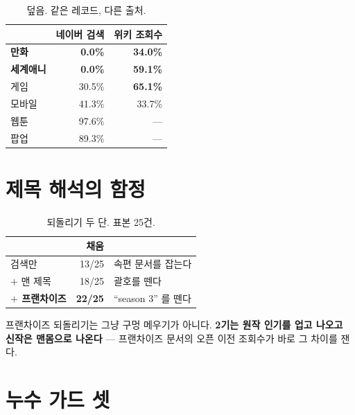 \documentclass[10pt]{article}
\begin{document}
\begin{table}[t]
\centering\tsize
\caption{덮음. 같은 레코드, 다른 출처.}
\begin{tabular}{lrr}
\toprule
& 네이버 검색 & \textbf{위키 조회수} \\
\midrule
\textbf{만화} & \textbf{0.0\%} & \textbf{34.0\%} \\
\textbf{세계애니} & \textbf{0.0\%} & \textbf{59.1\%} \\
게임 & 30.5\% & \textbf{65.1\%} \\
모바일 & 41.3\% & 33.7\% \\
웹툰 & 97.6\% & --- \\
팝업 & 89.3\% & --- \\
\bottomrule
\end{tabular}
\end{table}

\section{제목 해석의 함정}


\begin{table}[t]
\centering\tsize
\caption{되돌리기 두 단. 표본 25건.}
\begin{tabular}{lrl}
\toprule
& 채움 & \\
\midrule
검색만 & 13/25 & 속편 문서를 잡는다 \\
$+$ 맨 제목 & 18/25 & 괄호를 뗀다 \\
\textbf{$+$ 프랜차이즈} & \textbf{22/25} & ``season 3'' 를 뗀다 \\
\bottomrule
\end{tabular}
\end{table}

프랜차이즈 되돌리기는 그냥 구멍 메우기가 아니다. \textbf{2기는 원작 인기를
업고 나오고 신작은 맨몸으로 나온다} --- 프랜차이즈 문서의 오픈 이전 조회수가
바로 그 차이를 잰다.

\section{누수 가드 셋}
\end{document}

